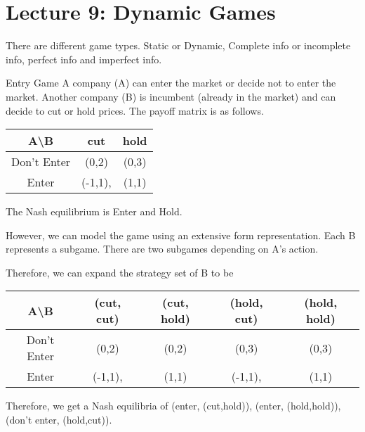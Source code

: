 \section{Lecture 9: Dynamic Games}
\newsection
There are different game types. Static or Dynamic, Complete info or incomplete info, perfect info and imperfect info.

\begin{aexample}{Entry Game}{}
    A company (A) can enter the market or decide not to enter the market. Another company (B) is incumbent (already in the market) and can decide to cut or hold prices. The payoff matrix is as follows.
    \begin{center}
        \begin{tabular}{|c|c c|}
            \hline
            A\textbackslash B & cut & hold\\
            \hline
            Don't Enter & (0,2) & (0,3)   \\
            \hline Enter & (-1,1),& (1,1) \\  \hline  
        \end{tabular}
    \end{center}
    The Nash equilibrium is Enter and Hold.
\end{aexample}
However, we can model the game using an extensive form representation. Each B represents a subgame. There are two subgames depending on A's action.
\begin{center}
\end{center}
Therefore, we can expand the strategy set of B to be 
\begin{center}
    \begin{tabular}{|c|c c c c|}
        \hline
        A\textbackslash B & (cut, cut) & (cut, hold) &(hold, cut) & (hold, hold) \\
        \hline
        Don't Enter & (0,2) &(0,2)&(0,3)& (0,3)   \\
        \hline Enter & (-1,1),& (1,1)  & (-1,1),& (1,1) \\  \hline  
    \end{tabular}
\end{center}
Therefore, we get a Nash equilibria of (enter, (cut,hold)), (enter, (hold,hold)), (don't enter, (hold,cut)).

